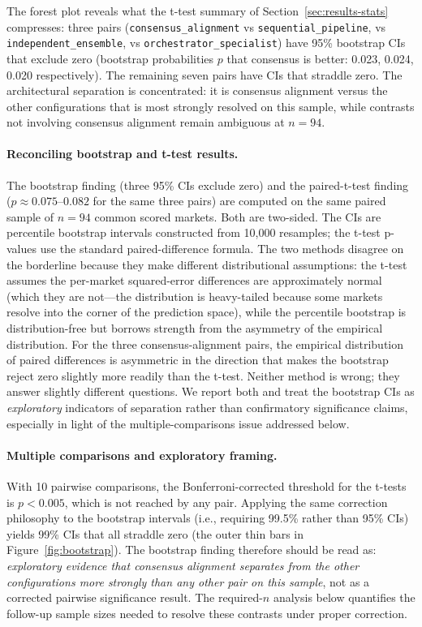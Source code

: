 \documentclass[11pt]{article}
\begin{document}
The forest plot reveals what the t-test summary of Section~\ref{sec:results-stats} compresses: three pairs (\texttt{consensus\_alignment} vs \texttt{sequential\_pipeline}, vs \texttt{independent\_ensemble}, vs \texttt{orchestrator\_specialist}) have 95\% bootstrap CIs that exclude zero (bootstrap probabilities $p$ that consensus is better: 0.023, 0.024, 0.020 respectively). The remaining seven pairs have CIs that straddle zero. The architectural separation is concentrated: it is consensus alignment versus the other configurations that is most strongly resolved on this sample, while contrasts not involving consensus alignment remain ambiguous at $n=94$.

\paragraph{Reconciling bootstrap and t-test results.}
The bootstrap finding (three 95\% CIs exclude zero) and the paired-t-test finding ($p \approx 0.075$--$0.082$ for the same three pairs) are computed on the same paired sample of $n = 94$ common scored markets. Both are two-sided. The CIs are percentile bootstrap intervals constructed from 10{,}000 resamples; the t-test p-values use the standard paired-difference formula. The two methods disagree on the borderline because they make different distributional assumptions: the t-test assumes the per-market squared-error differences are approximately normal (which they are not---the distribution is heavy-tailed because some markets resolve into the corner of the prediction space), while the percentile bootstrap is distribution-free but borrows strength from the asymmetry of the empirical distribution. For the three consensus-alignment pairs, the empirical distribution of paired differences is asymmetric in the direction that makes the bootstrap reject zero slightly more readily than the t-test. Neither method is wrong; they answer slightly different questions. We report both and treat the bootstrap CIs as \emph{exploratory} indicators of separation rather than confirmatory significance claims, especially in light of the multiple-comparisons issue addressed below.

\paragraph{Multiple comparisons and exploratory framing.}
With 10 pairwise comparisons, the Bonferroni-corrected threshold for the t-tests is $p < 0.005$, which is not reached by any pair. Applying the same correction philosophy to the bootstrap intervals (i.e., requiring 99.5\% rather than 95\% CIs) yields 99\% CIs that all straddle zero (the outer thin bars in Figure~\ref{fig:bootstrap}). The bootstrap finding therefore should be read as: \emph{exploratory evidence that consensus alignment separates from the other configurations more strongly than any other pair on this sample}, not as a corrected pairwise significance result. The required-$n$ analysis below quantifies the follow-up sample sizes needed to resolve these contrasts under proper correction.
\end{document}
